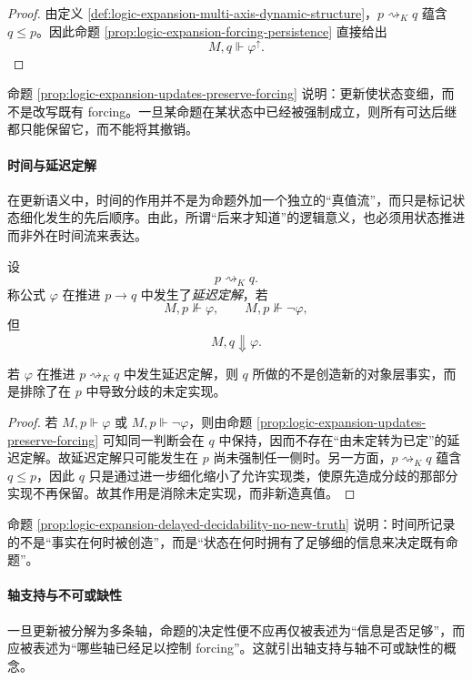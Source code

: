 \begin{proof}
由定义 \ref{def:logic-expansion-multi-axis-dynamic-structure}，\(p\rightsquigarrow_K q\) 蕴含 \(q\le p\)。因此命题 \ref{prop:logic-expansion-forcing-persistence} 直接给出
\[
M,q\Vdash \varphi^\uparrow.
\]
\end{proof}

命题 \ref{prop:logic-expansion-updates-preserve-forcing} 说明：更新使状态变细，而不是改写既有 forcing。一旦某命题在某状态中已经被强制成立，则所有可达后继都只能保留它，而不能将其撤销。

\paragraph{时间与延迟定解}
在更新语义中，时间的作用并不是为命题外加一个独立的“真值流”，而只是标记状态细化发生的先后顺序。由此，所谓“后来才知道”的逻辑意义，也必须用状态推进而非外在时间流来表达。

\begin{definition}[延迟定解]\label{def:logic-expansion-delayed-decidability}
设
\[
p\rightsquigarrow_K q.
\]
称公式 \(\varphi\) 在推进 \(p\to q\) 中发生了\emph{延迟定解}，若
\[
M,p\nVdash \varphi,
\qquad
M,p\nVdash \neg\varphi,
\]
但
\[
M,q\Downarrow \varphi.
\]
\end{definition}

\begin{proposition}[延迟定解不创造真值]\label{prop:logic-expansion-delayed-decidability-no-new-truth}
若 \(\varphi\) 在推进 \(p\rightsquigarrow_K q\) 中发生延迟定解，则 \(q\) 所做的不是创造新的对象层事实，而是排除了在 \(p\) 中导致分歧的未定实现。
\end{proposition}

\begin{proof}
若 \(M,p\Vdash \varphi\) 或 \(M,p\Vdash \neg\varphi\)，则由命题 \ref{prop:logic-expansion-updates-preserve-forcing} 可知同一判断会在 \(q\) 中保持，因而不存在“由未定转为已定”的延迟定解。故延迟定解只可能发生在 \(p\) 尚未强制任一侧时。另一方面，\(p\rightsquigarrow_K q\) 蕴含 \(q\le p\)，因此 \(q\) 只是通过进一步细化缩小了允许实现类，使原先造成分歧的那部分实现不再保留。故其作用是消除未定实现，而非新造真值。
\end{proof}

命题 \ref{prop:logic-expansion-delayed-decidability-no-new-truth} 说明：时间所记录的不是“事实在何时被创造”，而是“状态在何时拥有了足够细的信息来决定既有命题”。

\paragraph{轴支持与不可或缺性}
一旦更新被分解为多条轴，命题的决定性便不应再仅被表述为“信息是否足够”，而应被表述为“哪些轴已经足以控制 forcing”。这就引出轴支持与轴不可或缺性的概念。

